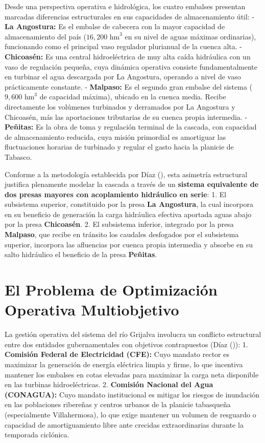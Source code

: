 \documentclass[
  spanish,
  letterpaper,
]{scrreprt}
\theoremstyle{definition}
\theoremstyle{remark}
\begin{document}
Desde una perspectiva operativa e hidrológica, los cuatro embalses
presentan marcadas diferencias estructurales en sus capacidades de
almacenamiento útil: - \textbf{La Angostura:} Es el embalse de cabecera
con la mayor capacidad de almacenamiento del país
(\(16,200\text{ hm}^3\) en su nivel de aguas máximas ordinarias),
funcionando como el principal vaso regulador plurianual de la cuenca
alta. - \textbf{Chicoasén:} Es una central hidroeléctrica de muy alta
caída hidráulica con un vaso de regulación pequeña, cuya dinámica
operativa consiste fundamentalmente en turbinar el agua descargada por
La Angostura, operando a nivel de vaso prácticamente constante. -
\textbf{Malpaso:} Es el segundo gran embalse del sistema
(\(9,600\text{ hm}^3\) de capacidad máxima), ubicado en la cuenca media.
Recibe directamente los volúmenes turbinados y derramados por La
Angostura y Chicoasén, más las aportaciones tributarias de su cuenca
propia intermedia. - \textbf{Peñitas:} Es la obra de toma y regulación
terminal de la cascada, con capacidad de almacenamiento reducida, cuya
misión primordial es amortiguar las fluctuaciones horarias de turbinado
y regular el gasto hacia la planicie de Tabasco.

Conforme a la metodología establecida por Díaz
(), esta asimetría estructural justifica
plenamente modelar la cascada a través de un \textbf{sistema equivalente
de dos presas mayores con acoplamiento hidráulico en serie}: 1. El
subsistema superior, constituido por la presa \textbf{La Angostura}, la
cual incorpora en su beneficio de generación la carga hidráulica
efectiva aportada aguas abajo por la presa \textbf{Chicoasén}. 2. El
subsistema inferior, integrado por la presa \textbf{Malpaso}, que recibe
en tránsito los caudales desfogados por el subsistema superior,
incorpora las afluencias por cuenca propia intermedia y absorbe en su
salto hidráulico el beneficio de la presa \textbf{Peñitas}.

\section{El Problema de Optimización Operativa
Multiobjetivo}\label{el-problema-de-optimizaciuxf3n-operativa-multiobjetivo}

La gestión operativa del sistema del río Grijalva involucra un conflicto
estructural entre dos entidades gubernamentales con objetivos
contrapuestos (Díaz ()): 1.
\textbf{Comisión Federal de Electricidad (CFE):} Cuyo mandato rector es
maximizar la generación de energía eléctrica limpia y firme, lo que
incentiva mantener los embalses en cotas elevadas para maximizar la
carga neta disponible en las turbinas hidroeléctricas. 2.
\textbf{Comisión Nacional del Agua (CONAGUA):} Cuyo mandato
institucional es mitigar los riesgos de inundación en las poblaciones
ribereñas y centros urbanos de la planicie tabasqueña (especialmente
Villahermosa), lo que exige mantener un volumen de resguardo o capacidad
de amortiguamiento libre ante crecidas extraordinarias durante la
temporada ciclónica.
\end{document}
